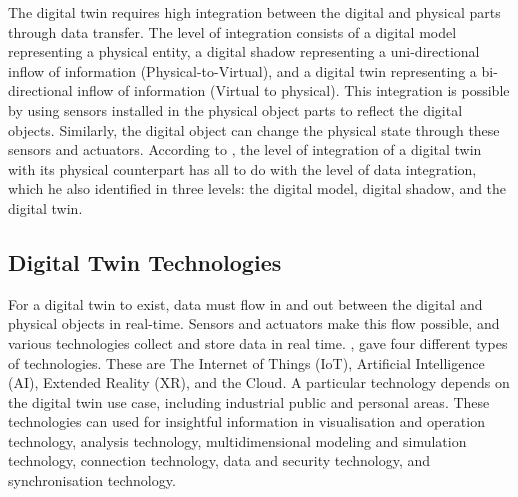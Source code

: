 The digital twin requires high integration between the digital and physical parts through data transfer. The level of integration consists of a digital model representing a physical entity, a digital shadow representing a uni-directional inflow of information (Physical-to-Virtual), and a digital twin representing a bi-directional inflow of information (Virtual to physical). This integration is possible by using sensors installed in the physical object parts to reflect the digital objects. Similarly, the digital object can change the physical state through these sensors and actuators. According to \cite{kritzinger2018}, the level of integration of a digital twin with its physical counterpart has all to do with the level of data integration, which he also identified in three levels: the digital model, digital shadow, and the digital twin. 
\subsection{Digital Twin Technologies}
For a digital twin to exist, data must flow in and out between the digital and physical objects in real-time. Sensors and actuators make this flow possible, and various technologies collect and store data in real time. \cite{attaran2023}, gave four different types of technologies. These are The Internet of Things (IoT), Artificial Intelligence (AI), Extended Reality (XR), and the Cloud. A particular technology depends on the digital twin use case, including industrial public and personal areas. These technologies can used for insightful information in visualisation and operation technology, analysis technology, multidimensional modeling and simulation technology, connection technology, data and security technology, and synchronisation technology. 

